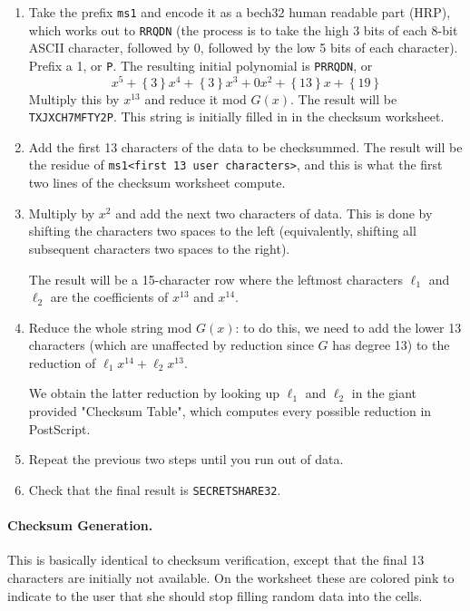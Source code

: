 \documentclass[letterpaper]{article}
\theoremstyle{xxx}
\theoremstyle{evil}
\theoremstyle{yyy}
\theoremstyle{plain}
\theoremstyle{zzz}
\newcommand{\binrep}[1]{\left\{#1\right\}}
\begin{document}
\begin{enumerate}
\item Take the prefix \texttt{ms1} and encode it as a bech32 human readable part (HRP),
which works out to \texttt{RRQDN} (the process is to take the high 3 bits of each
8-bit ASCII character, followed by 0, followed by the low 5 bits of each character).
Prefix a 1, or \texttt{P}. The resulting initial polynomial is \texttt{PRRQDN}, or
\[ x^5 + \binrep{3}x^4 + \binrep{3}x^3 + 0x^2 + \binrep{13}x + \binrep{19} \]
Multiply this by $x^{13}$ and reduce it mod $G(x)$. The result will be
\texttt{TXJXCH7MFTY2P}. This string is initially filled in in the checksum
worksheet.

\item Add the first 13 characters of the data to be checksummed. The result will
be the residue of \texttt{ms1<first 13 user characters>}, and this is what the
first two lines of the checksum worksheet compute.

\item Multiply by $x^2$ and add the next two characters of data. This is done by
shifting the characters two spaces to the left (equivalently, shifting all
subsequent characters two spaces to the right).

The result will be a 15-character row where the leftmost characters $\ell_1$
and $\ell_2$ are the coefficients of $x^{13}$ and $x^{14}$.

\item Reduce the whole string mod $G(x)$: to do this, we need to add the lower
13 characters (which are unaffected by reduction since $G$ has degree 13) to
the reduction of $\ell_1x^{14} + \ell_2x^{13}$.

We obtain the latter reduction by looking up $\ell_1$ and $\ell_2$ in the
giant provided "Checksum Table", which computes every possible reduction
in PostScript.

\item Repeat the previous two steps until you run out of data.
\item Check that the final result is \texttt{SECRETSHARE32}.
\end{enumerate}

\paragraph{Checksum Generation.} This is basically identical to checksum verification,
except that the final 13 characters are initially not available. On the worksheet these
are colored pink to indicate to the user that she should stop filling random data into
the cells.
\end{document}
